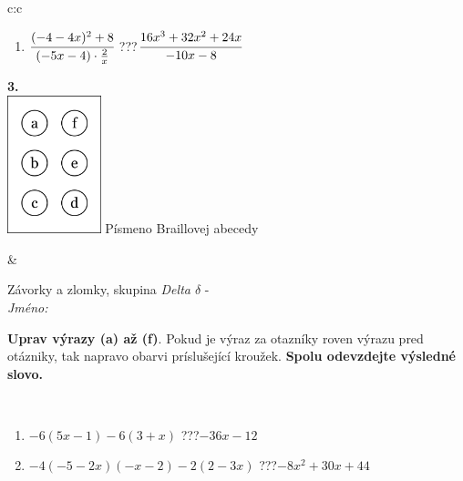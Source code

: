 \documentclass[10pt]{report}
\begin{document}
\begin{tabular}{c:c}
\begin{minipage}[c][104.5mm][t]{0.5\linewidth}
\begin{center}
\begin{minipage}{0.79\linewidth}
\begin{center}
\begin{varwidth}{\linewidth}
\begin{enumerate}
\item $\cfrac{(-4-4x)^2+8}{(-5x-4)\cdot\frac{2}{x}}$\quad \dotfill\; ???\;\dotfill \quad $\cfrac{16x^3+32x^2+24x}{-10x-8}$
\end{enumerate}
\end{varwidth}
\end{center}
\end{minipage}
\begin{minipage}{0.20\linewidth}
\begin{center}
{\Huge\bfseries 3.} \\[2mm]
\includegraphics[height=40mm]{../images/braille.png}
{\small Písmeno Braillovej abecedy}
\end{center}
\end{minipage}
\end{center}
\end{minipage}
&
\begin{minipage}[c][104.5mm][t]{0.5\linewidth}
\begin{center}
\vspace{7mm}
{\huge Závorky a zlomky, skupina \textit{Delta $\delta$} -}\\[5mm]
\textit{Jméno:}\phantom{xxxxxxxxxxxxxxxxxxxxxxxxxxxxxxxxxxxxxxxxxxxxxxxxxxxxxxxxxxxxxxxxx}\\[5mm]
\begin{minipage}{0.95\linewidth}
\begin{center}
\textbf{Uprav výrazy (a) až (f)}. Pokud je výraz za otazníky roven výrazu pred otázniky, tak napravo obarvi príslušející kroužek. \textbf{Spolu odevzdejte výsledné slovo.}
\end{center}
\end{minipage}
\\[1mm]
\begin{minipage}{0.79\linewidth}
\begin{center}
\begin{varwidth}{\linewidth}
\begin{enumerate}
\normalsize
\item $-6(5x-1)-6(3+x)$\quad \dotfill\; ???\;\dotfill \quad $-36x-12$
\item $-4(-5-2x)(-x-2)-2(2-3x)$\quad \dotfill\; ???\;\dotfill \quad $-8x^2+30x+44$

\end{enumerate}
\end{varwidth}
\end{center}
\end{minipage}
\end{center}
\end{minipage}
\end{tabular}
\end{document}
